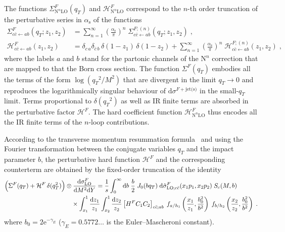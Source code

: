 \documentclass[12pt]{article}
\DeclareRobustCommand{\nn}{\nonumber}
\DeclareRobustCommand{\alphas}{\ensuremath{\alpha_{\mathrm{s}}}\xspace}
\DeclareRobustCommand{\as}{\alphas}
\DeclareRobustCommand{\asOpi}{\ensuremath{\left(\frac{\as}{\pi}\right)}} %
\DeclareRobustCommand{\mur}{\ensuremath{\mu_{\mathrm{R}}}\xspace}
\DeclareRobustCommand{\muf}{\ensuremath{\mu_{\mathrm{F}}}\xspace}
\DeclareRobustCommand{\qt}{\ensuremath{q_T}\xspace}
\DeclareRobustCommand{\rd}{\ensuremath{\mathrm{d}}}
\DeclareRobustCommand{\cH}{\ensuremath{\mathcal{H}}}
\DeclareRobustCommand{\jets}{\text{jet(s)}\xspace}
\DeclareRobustCommand{\LO}{\text{LO}\xspace}
\DeclareRobustCommand{\N}[1]{\ensuremath{\text{N}^{#1}}} %
\begin{document}
The functions $\Sigma^{F}_{\N{n}\LO}(\qt)$ and $\cH^{F}_{\N{n}\LO}$ correspond to the $n$-th order truncation of the perturbative series in $\as$ of the functions
\begin{align}
  \Sigma^F_{c\bar{c} \gets ab}(\qt; z_1,z_2) %
  &=
  \sum_{n=1}^\infty \asOpi^n \; 
  \Sigma^{F;(n)}_{c\bar{c} \gets ab}(\qt; z_1,z_2) %
  \;,
  \label{eq:sigexpansion}
  \\
  \cH^F_{c\bar{c} \gets ab}(z_1,z_2) %
  &=
  \delta_{c\,a}\delta_{\bar{c}\,b} \, \delta(1-z_1) \, \delta(1-z_2) +
  \sum_{n=1}^\infty \asOpi^n \; 
  \cH^{F;(n)}_{c\bar{c} \gets ab}(z_1,z_2) %
  \;,
  \label{Hstexpand}
\end{align}
where the labels $a$ and $b$ stand for the partonic channels of the \N{n}\LO correction that are mapped to that the Born cross section. 
The function $ \Sigma^{F}(\qt)$ embodies all the terms of the form $\log(\qt^2/M^2)$ that are divergent in the limit $\qt \rightarrow 0$ and reproduces the logarithmically singular behaviour of  $\rd\sigma^{F+\jets}$ in the small-$\qt$ limit. 
Terms proportional to $\delta(\qt^{2})$ as well as IR finite terms are absorbed in the perturbative factor $\mathcal{H}^{F}$. The hard coefficient function $\mathcal{H}^{F}_{\N{n}\LO}$ thus encodes all the IR finite terms of the $n$-loop contributions.


According to the transverse momentum resummation formula~\cite{Bozzi:2005wk} and using the Fourier transformation between the conjugate variables $\qt$ and the impact parameter $b$, the perturbative hard function $\cH^{F}$ and the corresponding counterterm are obtained by the fixed-order truncation of the identity 
\begin{align}
  \Bigl( \Sigma^F(\qt)  + \cH^F\,\delta(\qt^2) \Bigr) &\otimes 
  \frac{\rd\sigma^{F}_{\LO}}{\rd M^2\rd Y} 
  =
  \frac{1}{s}\int_0^\infty\rd b\;\frac{b}{2}\;J_0(b\qt)\;
  \rd\hat{\sigma}^{F}_{\LO;c\bar{c}}(x_1 p_1, x_2 p_2) \; 
  S_c(M,b) \; 
  \nn\\&\quad\times
\int_{x_{1}}^1 \frac{\rd z_1}{z_{1}} \int_{x_{2}}^1  \frac{\rd z_2}{z_{2}} 
  \left[ H^{F} C_1 C_2 \right]_{c\bar{c};ab} \;
  f_{a/h_1}\left(\frac{x_1}{z_1},\frac{b_0^2}{b^2}\right) \; f_{b/h_2}\left(\frac{x_2}{z_2},\frac{b_0^2}{b^2}\right) \;.
  \label{reslean}
\end{align}
where  $b_0=2 \mathrm{e}^{-\gamma_E}$ ($\gamma_E=0.5772\ldots$  is the Euler--Mascheroni constant).
\end{document}
